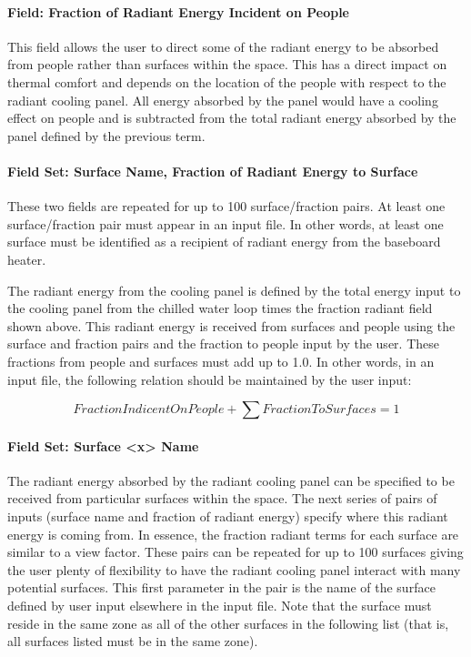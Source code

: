 \paragraph{Field: Fraction of Radiant Energy Incident on People}\label{field-fraction-of-radiant-energy-incident-on-people-2-1}

This field allows the user to direct some of the radiant energy to be absorbed from people rather than surfaces within the space.  This has a direct impact on thermal comfort and depends on the location of the people with respect to the radiant cooling panel.  All energy absorbed by the panel would have a cooling effect on people and is subtracted from the total radiant energy absorbed by the panel defined by the previous term.

\paragraph{Field Set: Surface Name, Fraction of Radiant Energy to Surface}\label{field-set-surface-name-fraction-of-radiant-energy-to-surface-2-1}

These two fields are repeated for up to 100 surface/fraction pairs. At least one surface/fraction pair must appear in an input file. In other words, at least one surface must be identified as a recipient of radiant energy from the baseboard heater.

The radiant energy from the cooling panel is defined by the total energy input to the cooling panel from the chilled water loop times the fraction radiant field shown above. This radiant energy is received from surfaces and people using the surface and fraction pairs and the fraction to people input by the user. These fractions from people and surfaces must add up to 1.0. In other words, in an input file, the following relation should be maintained by the user input:

\begin{equation}
FractionIndicentOnPeople + \sum {FractionToSurfaces} = 1
\end{equation}

\paragraph{Field Set: Surface \textless{}x\textgreater{} Name}\label{field-set-surface-x-name-1}

The radiant energy absorbed by the radiant cooling panel can be specified to be received from particular surfaces within the space.  The next series of pairs of inputs (surface name and fraction of radiant energy) specify where this radiant energy is coming from.  In essence, the fraction radiant terms for each surface are similar to a view factor.  These pairs can be repeated for up to 100 surfaces giving the user plenty of flexibility to have the radiant cooling panel interact with many potential surfaces.  This first parameter in the pair is the name of the surface defined by user input elsewhere in the input file.  Note that the surface must reside in the same zone as all of the other surfaces in the following list (that is, all surfaces listed must be in the same zone).

